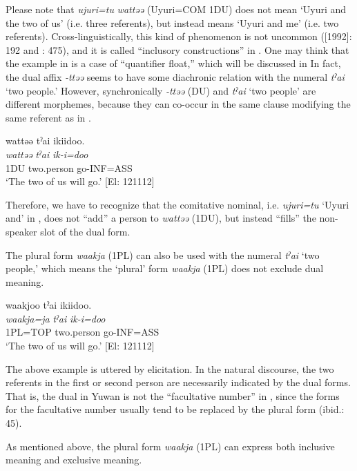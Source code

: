 Please note that \textit{ujuri=tu} \textit{wattəə} (Uyuri=COM 1DU) does not mean ‘Uyuri and the two of us’ (i.e. three referents), but instead means ‘Uyuri and me’ (i.e. two referents). Cross-linguistically, this kind of phenomenon is not uncommon (\citealt{Jespersen1924}[1992]: 192 and \citealt{Moravcsik2003}: 475), and it is called “inclusory constructions” in \citet{Lichtenberk2000}. One may think that the example in  is a case of “quantifier float,” which will be discussed in  In fact, the dual affix \textit{{}-ttəə} seems to have some diachronic relation with the numeral \textit{tˀai} ‘two people.’ However, synchronically \textit{{}-ttəə} (DU) and \textit{tˀai} ‘two people’ are different morphemes, because they can co-occur in the same clause modifying the same referent as in .

\ea \label{ex:5:5}   %
\glll  wattəə  tˀai  ikiidoo.\\
\textit{wattəə}  \textit{tˀai}  \textit{ik-i=doo}\\
1DU  two.person  go-INF=ASS\\
\glt ‘The two of us will go.’ [El: 121112]
\z

Therefore, we have to recognize that the comitative nominal, i.e. \textit{ujuri=tu} ‘Uyuri and’ in , does not “add” a person to \textit{wattəə} (1DU), but instead “fills” the non-speaker slot of the dual form.

The plural form \textit{waakja} (1PL) can also be used with the numeral \textit{tˀai} ‘two people,’ which means the ‘plural’ form \textit{waakja} (1PL) does not exclude dual meaning.

\ea \label{ex:5:6}   %
\glll  waakjoo  tˀai  ikiidoo.\\
\textit{waakja=ja}  \textit{tˀai}  \textit{ik-i=doo}\\
1PL=TOP  two.person  go-INF=ASS\\
\glt ‘The two of us will go.’ [El: 121112]
\z

The above example is uttered by elicitation. In the natural discourse, the two referents in the first or second person are necessarily indicated by the dual forms. That is, the dual in Yuwan is not the “facultative number” in \citet{Corbett2000}, since the forms for the facultative number usually tend to be replaced by the plural form (ibid.: 45).

As mentioned above, the plural form \textit{waakja} (1PL) can express both inclusive meaning and exclusive meaning.


